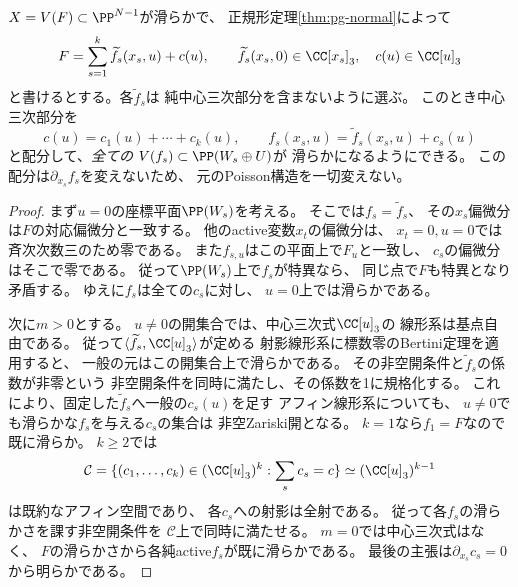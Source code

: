 \begin{lemma}[中心三次式の配分による全ブロックの滑らか化]
\label{lem:pg-central-splitting-smooth}
$X=V(F)\subset\PP^{N-1}$が滑らかで、
正規形定理\ref{thm:pg-normal}によって
\begin{equation}
 F=\sum_{s=1}^k\widetilde f_s(x_s,u)+c(u),
 \qquad
 \widetilde f_s(x_s,0)\in\CC[x_s]_3,\quad
 c(u)\in\CC[u]_3
 \label{eq:pg-det-central-splitting}
\end{equation}
と書けるとする。各$\widetilde f_s$は
純中心三次部分を含まないように選ぶ。
このとき中心三次部分を
\begin{equation}
 c(u)=c_1(u)+\cdots+c_k(u),\qquad
 f_s(x_s,u)=\widetilde f_s(x_s,u)+c_s(u)
 \label{eq:pg-det-center-distribution}
\end{equation}
と配分して、\emph{全ての}
$V(f_s)\subset\PP(W_s\oplus U)$が
滑らかになるようにできる。
この配分は$\partial_{x_s}f_s$を変えないため、
元のPoisson構造を一切変えない。
\end{lemma}
\begin{proof}
まず$u=0$の座標平面$\PP(W_s)$を考える。
そこでは$f_s=\widetilde f_s$、
その$x_s$偏微分は$F$の対応偏微分と一致する。
他のactive変数$x_t$の偏微分は、
$x_t=0,u=0$では斉次次数三のため零である。
また$f_{s,u}$はこの平面上で$F_u$と一致し、
$c_s$の偏微分はそこで零である。
従って$\PP(W_s)$上で$f_s$が特異なら、
同じ点で$F$も特異となり矛盾する。
ゆえに$f_s$は全ての$c_s$に対し、
$u=0$上では滑らかである。

次に$m>0$とする。
$u\ne0$の開集合では、中心三次式$\CC[u]_3$の
線形系は基点自由である。
従って$\langle\widetilde f_s,\CC[u]_3\rangle$が定める
射影線形系に標数零のBertini定理を適用すると、
一般の元はこの開集合上で滑らかである。
その非空開条件と$\widetilde f_s$の係数が非零という
非空開条件を同時に満たし、その係数を1に規格化する。
これにより、固定した$\widetilde f_s$へ一般の$c_s(u)$を足す
アフィン線形系についても、
$u\ne0$でも滑らかな$f_s$を与える$c_s$の集合は
非空Zariski開となる。
$k=1$なら$f_1=F$なので既に滑らか。
$k\ge2$では
\begin{equation}
 \mathcal C=
 \{(c_1,\ldots,c_k)\in(\CC[u]_3)^k:
 \sum_sc_s=c\}\simeq(\CC[u]_3)^{k-1}
 \label{eq:pg-det-distribution-space}
\end{equation}
は既約なアフィン空間であり、
各$c_s$への射影は全射である。
従って各$f_s$の滑らかさを課す非空開条件を
$\mathcal C$上で同時に満たせる。
$m=0$では中心三次式はなく、
$F$の滑らかさから各純active$f_s$が既に滑らかである。
最後の主張は$\partial_{x_s}c_s=0$から明らかである。
\end{proof}


